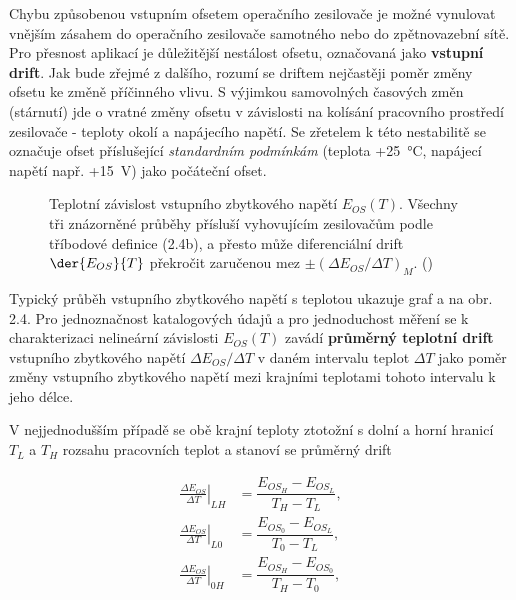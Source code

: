         Chybu způsobenou vstupním ofsetem operačního zesilovače je možné vynulovat vnějším zásahem
        do operačního zesilovače samotného nebo do zpětnovazební sítě. Pro přesnost aplikací je
        důležitější nestálost ofsetu, označovaná jako \textbf{vstupní drift}. Jak bude zřejmé z
        dalšího, rozumí se driftem nejčastěji poměr změny ofsetu ke změně příčinného vlivu. S
        výjimkou samovolných časových změn (stárnutí) jde o vratné změny ofsetu v závislosti na
        kolísání pracovního prostředí zesilovače - teploty okolí a napájecího napětí. Se zřetelem k
        této nestabilitě se označuje ofset příslušející \emph{standardním podmínkám} (teplota
        +\qty{25}{\degreeCelsius}, napájecí napětí např. +\qty{15}{\V}) jako počáteční ofset.
        
        \begin{figure}[ht!] %
          \centering
          \caption{Teplotní závislost vstupního zbytkového napětí \(E_{OS}(T)\). Všechny tři
                  znázorněné průběhy přísluší vyhovujícím zesilovačům podle tříbodové definice
                  (2.4b), a přesto může diferenciální drift \(\der{E_{OS}}{T}\) překročit zaručenou
                  mez \(\pm(\Delta E_{OS}/\Delta T)_M\). (\cite[s.~17]{Dostal})}
          \label{aes:fig049}
        \end{figure}

        Typický průběh vstupního zbytkového napětí s teplotou ukazuje graf a na obr. 2.4. Pro
        jednoznačnost katalogových údajů a pro jednoduchost měření se k charakterizaci nelineární
        závislosti \(E_{OS}(T)\) zavádí \textbf{průměrný teplotní drift} vstupního zbytkového napětí
        \(\Delta E_{OS}/\Delta T\) v daném intervalu teplot \(\Delta T\) jako poměr změny vstupního
        zbytkového napětí mezi krajními teplotami tohoto intervalu k jeho délce.   
        
        V nejjednodušším případě se obě krajní teploty ztotožní s dolní a horní hranicí \(T_L\) a
        \(T_H\) rozsahu pracovních teplot a stanoví se průměrný drift

        \begin{subequations}\label{aes:eq039}
          \begin{align}
            \left.\frac{\Delta E_{OS}}{\Delta T}\right\rvert_{LH} &= 
                                    \dfrac{E_{OS_H} - E_{OS_L}}{T_H - T_L}, \label{aes:eq039a} \\
            \left.\frac{\Delta E_{OS}}{\Delta T}\right\rvert_{L0} &= 
                                    \dfrac{E_{OS_0} - E_{OS_L}}{T_0 - T_L}, \label{aes:eq039b} \\
            \left.\frac{\Delta E_{OS}}{\Delta T}\right\rvert_{0H} &= 
                                    \dfrac{E_{OS_H} - E_{OS_0}}{T_H - T_0}, \label{aes:eq039c}
          \end{align}
        \end{subequations}

